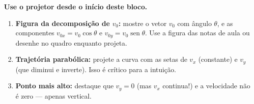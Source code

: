 \documentclass[12pt,a4paper]{article}
\begin{document}
\begin{tcolorbox}[projetorbox]
  \textbf{Use o projetor desde o in\'icio deste bloco.}

  \begin{enumerate}[nosep]
    \item \textbf{Figura da decomposi\c{c}\~ao de $v_0$:} mostre o vetor
          $v_0$ com \^angulo $\theta$, e as componentes $v_{0x} = v_0\cos\theta$
          e $v_{0y} = v_0\operatorname{sen}\theta$.
          Use a figura das notas de aula ou desenhe no quadro enquanto
          projeta.
    \item \textbf{Trajet\'oria parab\'olica:} projete a curva com as
          setas de $v_x$ (constante) e $v_y$ (que diminui e inverte).
          Isso \'e cr\'itico para a intui\c{c}\~ao.
    \item \textbf{Ponto mais alto:} destaque que $v_y = 0$ (mas $v_x$
          continua!) e a velocidade n\~ao \'e zero --- apenas vertical.
  \end{enumerate}
\end{tcolorbox}
\end{document}
